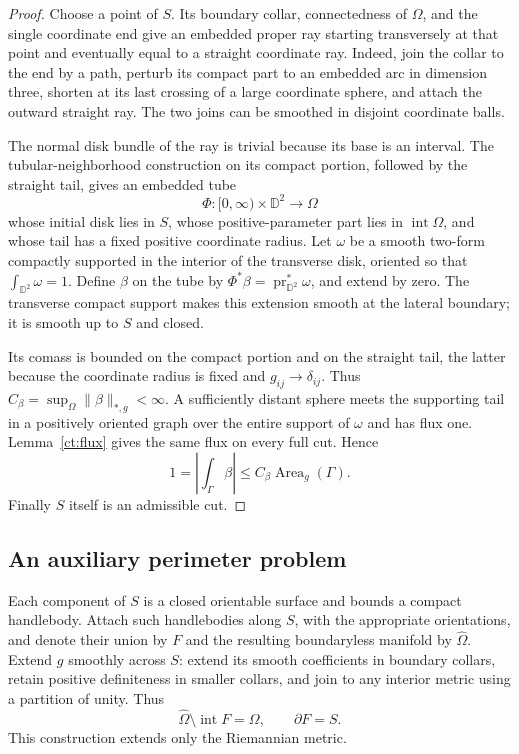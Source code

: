 \begin{proof}
Choose a point of $S$. Its boundary collar, connectedness of $\Omega$,
and the single coordinate end give an embedded proper ray starting
transversely at that point and eventually equal to a straight coordinate
ray. Indeed, join the collar to the end by a path, perturb its compact
part to an embedded arc in dimension three, shorten at its last crossing
of a large coordinate sphere, and attach the outward straight ray.
The two joins can be smoothed in disjoint coordinate balls.

The normal disk bundle of the ray is trivial because its base is an
interval. The tubular-neighborhood construction on its compact portion,
followed by the straight tail, gives an embedded tube
\[
 \Phi:[0,\infty)\times\mathbb D^2\longrightarrow\Omega
\]
whose initial disk lies in $S$, whose positive-parameter part lies in
$\operatorname{int}\Omega$, and whose tail has a fixed positive coordinate
radius. Let $\omega$ be a smooth two-form compactly supported in the
interior of the transverse disk, oriented so that
$\int_{\mathbb D^2}\omega=1$. Define $\beta$ on the tube by
$\Phi^*\beta=\operatorname{pr}_{\mathbb D^2}^*\omega$, and extend by zero.
The transverse compact support makes this extension smooth at the lateral
boundary; it is smooth up to $S$ and closed.

Its comass is bounded on the compact portion and on the straight tail,
the latter because the coordinate radius is fixed and
$g_{ij}\to\delta_{ij}$. Thus $C_\beta=\sup_\Omega\|\beta\|_{*,g}<\infty$.
A sufficiently distant sphere meets the supporting tail in a positively
oriented graph over the entire support of $\omega$ and has flux one.
Lemma~\ref{ct:flux} gives the same flux on every full cut. Hence
\[
 1=\left|\int_\Gamma\beta\right|
 \leq C_\beta\operatorname{Area}_g(\Gamma).
\]
Finally $S$ itself is an admissible cut.
\end{proof}

\subsection{An auxiliary perimeter problem}
\label{ct:perimeter-subsection}

Each component of $S$ is a closed orientable surface and bounds a compact
handlebody. Attach such handlebodies along $S$, with the appropriate
orientations, and denote their union by $F$ and the resulting boundaryless
manifold by $\widehat\Omega$. Extend $g$ smoothly across $S$: extend its
smooth coefficients in boundary collars, retain positive definiteness
in smaller collars, and join to any interior metric using a partition
of unity. Thus
\[
 \widehat\Omega\setminus\operatorname{int}F=\Omega,\qquad \partial F=S.
\]
This construction extends only the Riemannian metric.

